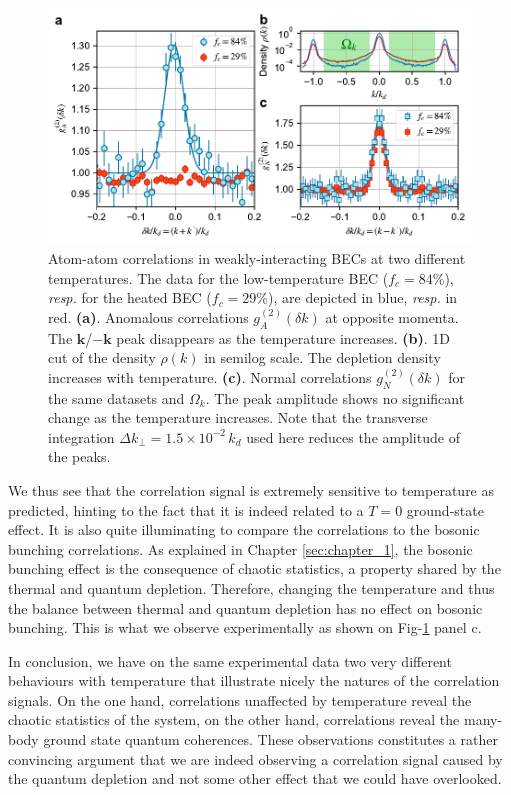 \begin{figure}
    \centering
    \includegraphics[width=\textwidth]{Fig/Chapter4/kmk_temperature_error_bars.pdf}
    \caption{Atom-atom correlations in weakly-interacting BECs at two different temperatures. The data for the low-temperature BEC ($f_{c}=84\%$), {\it resp.} for the heated BEC ($f_{c}=29\%$), are depicted in blue, {\it resp.} in red. 
    {\bf (a)}. Anomalous correlations $g_{A}^{(2)}(\delta k)$ at opposite momenta. The ${\bm k}$/$-{\bm k}$ peak disappears as the temperature increases.
    {\bf (b)}. 1D cut of the density $\rho(k)$ in semilog scale. The depletion density increases with temperature.
    {\bf (c)}. Normal correlations $g_{N}^{(2)}(\delta k)$ for the same datasets and $\Omega_k$. The peak amplitude shows no significant change as the temperature increases. Note that the transverse integration $\Delta k_{\perp}=1.5 \times 10^{-2} \, k_d$ used here reduces the amplitude of the peaks.}
    \label{fig:kmk_temperature}
\end{figure}

We thus see that the \kmk correlation signal is extremely sensitive to temperature as predicted, hinting to the fact that it is indeed related to a $T=0$ ground-state effect. It is also quite illuminating to compare the \kmk correlations to the bosonic bunching \kk correlations. As explained in Chapter \ref{sec:chapter_1}, the bosonic bunching effect is the consequence of chaotic statistics, a property shared by the thermal and quantum depletion. Therefore, changing the temperature and thus the balance between thermal and quantum depletion has no effect on bosonic bunching. This is what we observe experimentally as shown on Fig-\ref{fig:kmk_temperature} panel c.

In conclusion, we have on the same experimental data two very different behaviours with temperature that illustrate nicely the natures of the correlation signals. On the one hand, \kk correlations unaffected by temperature reveal the chaotic statistics of the system, on the other hand, \kmk correlations reveal the many-body ground state quantum coherences. These observations constitutes a rather convincing argument that we are indeed observing a \kmk correlation signal caused by the quantum depletion and not some other effect that we could have overlooked.

